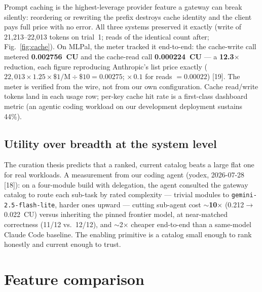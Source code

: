 \documentclass[10pt]{article}
\begin{document}
Prompt caching is the highest-leverage provider feature a gateway can break silently: reordering or rewriting the prefix destroys cache identity and the client pays full price with no error. All three systems preserved it exactly (write of 21{,}213--22{,}013 tokens on trial~1; reads of the identical count after; Fig.~\ref{fig:cache}). On MLPal, the meter tracked it end-to-end: the cache-write call metered \textbf{0.002756~CU} and the cache-read call \textbf{0.000224~CU} --- a \textbf{12.3$\times$} reduction, each figure reproducing Anthropic's list price exactly ($22{,}013 \times 1.25 \times \$1/\mathrm{M} \div \$10 = 0.00275$; $\times\,0.1$ for reads $= 0.00022$) [19]. The meter is verified from the wire, not from our own configuration. Cache read/write tokens land in each usage row; per-key cache hit rate is a first-class dashboard metric (an agentic coding workload on our development deployment sustains 44\%).

\subsection{Utility over breadth at the system level}\label{sec:utility}
The curation thesis predicts that a ranked, current catalog beats a large flat one for real workloads. A measurement from our coding agent (yodex, 2026-07-28 [18]): on a four-module build with delegation, the agent consulted the gateway catalog to route each sub-task by rated complexity --- trivial modules to \texttt{gemini-2.5-flash-lite}, harder ones upward --- cutting sub-agent cost \textbf{$\sim$10$\times$} (0.212$\rightarrow$0.022~CU) versus inheriting the pinned frontier model, at near-matched correctness (11/12 vs.\ 12/12), and $\sim$2$\times$ cheaper end-to-end than a same-model Claude Code baseline. The enabling primitive is a catalog small enough to rank honestly and current enough to trust.

\section{Feature comparison}\label{sec:features}
\end{document}
